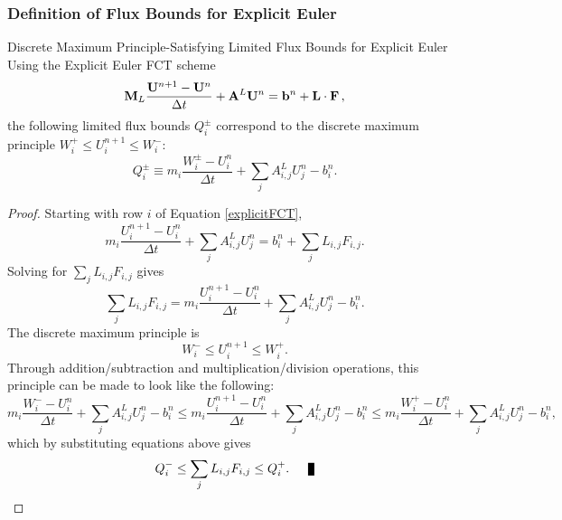 \subsubsection{Definition of Flux Bounds for Explicit Euler}
\begin{theorem}{Discrete Maximum Principle-Satisfying Limited Flux Bounds for
  Explicit Euler}
   Using the Explicit Euler FCT scheme
   \begin{equation}\label{explicitFCT}
      \mathbf{M}_L\frac{\mathbf{U}^{n+1}-\mathbf{U}^n}{\Delta t}
         + \mathbf{A}^L\mathbf{U}^n
         = \mathbf{b}^n + \mathbf{L}\cdot\mathbf{F} \,,
   \end{equation}
   the following limited flux bounds $Q_i^\pm$ correspond to the discrete
   maximum principle $W_i^+\le U_i^{n+1}\le W_i^-$:
   \begin{equation}\label{Q_ex}
      Q_i^\pm \equiv m_i\frac{W_i^\pm-U_i^n}{\Delta t}
      + \sum\limits_j A_{i,j}^L U_j^n - b_i^n.
   \end{equation}
\end{theorem}

\begin{proof}
   Starting with row $i$ of Equation \eqref{explicitFCT},
   \[
      m_i\frac{U_i^{n+1}-U_i^n}{\Delta t}
      + \sum\limits_j A_{i,j}^L U_j^n
      = b_i^n + \sum\limits_j L_{i,j}F_{i,j}.
   \]
   Solving for $\sum\limits_j L_{i,j}F_{i,j}$ gives
   \[
      \sum\limits_j L_{i,j}F_{i,j} =
      m_i\frac{U_i^{n+1}-U_i^n}{\Delta t}
      + \sum\limits_j A_{i,j}^L U_j^n
      - b_i^n.
   \]
   The discrete maximum principle is
   \[
      W_i^-\le U_i^{n+1}\le W_i^+.
   \]
   Through addition/subtraction and multiplication/division operations, this
   principle can be made to look like the following:
   \[
   m_i\frac{W_i^- -U_i^n}{\Delta t}
      + \sum\limits_j A_{i,j}^L U_j^n
      - b_i^n
   \le m_i\frac{U_i^{n+1}-U_i^n}{\Delta t}
      + \sum\limits_j A_{i,j}^L U_j^n
      - b_i^n
   \le m_i\frac{W_i^+ -U_i^n}{\Delta t}
      + \sum\limits_j A_{i,j}^L U_j^n
      - b_i^n,
   \]
   which by substituting equations above gives
   \[
      Q_i^-\le\sum\limits_j L_{i,j}F_{i,j}\le Q_i^+.\qed
   \]
\end{proof}
